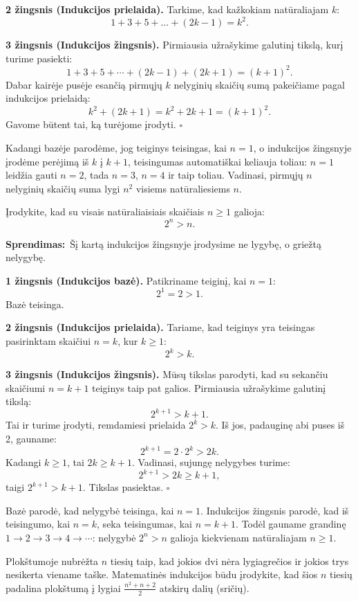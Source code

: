 \documentclass[11pt,a4paper]{scrartcl}
\begin{document}
\textbf{2 žingsnis (Indukcijos prielaida).} Tarkime, kad kažkokiam natūraliajam $k$:
$$
1+3+5+\dots+(2k-1)=k^2.
$$

\textbf{3 žingsnis (Indukcijos žingsnis).} Pirmiausia užrašykime galutinį tikslą, kurį turime pasiekti:
\begin{equation}
1+3+5+\cdots+(2k-1)+(2k+1)=(k+1)^2.
\end{equation}
Dabar kairėje pusėje esančią pirmųjų $k$ nelyginių skaičių sumą pakeičiame pagal indukcijos prielaidą:
$$
k^2+(2k+1)=k^2+2k+1=(k+1)^2.
$$
Gavome būtent tai, ką turėjome įrodyti. \hfill $\square$

Kadangi bazėje parodėme, jog teiginys teisingas, kai $n=1$, o indukcijos žingsnyje įrodėme perėjimą iš $k$ į $k+1$, teisingumas automatiškai keliauja toliau: $n=1$ leidžia gauti $n=2$, tada $n=3$, $n=4$ ir taip toliau. Vadinasi, pirmųjų $n$ nelyginių skaičių suma lygi $n^2$ visiems natūraliesiems $n$.

\begin{example}[Nelygybė]
Įrodykite, kad su visais natūraliaisiais skaičiais $n\geq 1$ galioja:
$$
2^n>n.
$$
\end{example}

\textbf{Sprendimas:}\
Šį kartą indukcijos žingsnyje įrodysime ne lygybę, o griežtą nelygybę.

\textbf{1 žingsnis (Indukcijos bazė).} Patikriname teiginį, kai $n=1$:
$$
2^1=2>1.
$$
Bazė teisinga.

\textbf{2 žingsnis (Indukcijos prielaida).} Tariame, kad teiginys yra teisingas pasirinktam skaičiui $n=k$, kur $k\geq 1$:
$$
2^k>k.
$$

\textbf{3 žingsnis (Indukcijos žingsnis).} Mūsų tikslas parodyti, kad su sekančiu skaičiumi $n = k+1$ teiginys taip pat galios. Pirmiausia užrašykime galutinį tikslą:
\begin{equation}
2^{k+1}>k+1.
\end{equation}
Tai ir turime įrodyti, remdamiesi prielaida $2^k>k$. Iš jos, padauginę abi puses iš 2, gauname:
$$
2^{k+1}=2\cdot 2^k>2k.
$$
Kadangi $k\geq 1$, tai $2k\geq k+1$. Vadinasi, sujungę nelygybes turime:
$$
2^{k+1}>2k\geq k+1,
$$
taigi $2^{k+1}>k+1$. Tikslas pasiektas. \hfill $\square$

Bazė parodė, kad nelygybė teisinga, kai $n=1$. Indukcijos žingsnis parodė, kad iš teisingumo, kai $n=k$, seka teisingumas, kai $n=k+1$. Todėl gauname grandinę $1\to2\to3\to4\to\cdots$: nelygybė $2^n>n$ galioja kiekvienam natūraliajam $n\geq1$.


\begin{example}
Plokštumoje nubrėžta $n$ tiesių taip, kad jokios dvi nėra lygiagrečios ir jokios trys nesikerta viename taške. Matematinės indukcijos būdu įrodykite, kad šios $n$ tiesių padalina plokštumą į lygiai $\frac{n^2 + n + 2}{2}$ atskirų dalių (sričių).
\end{example}
\end{document}
